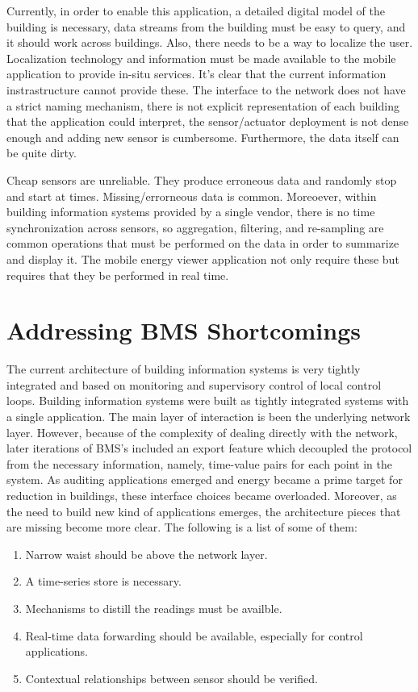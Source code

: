Currently, in order to enable this application, a detailed digital model of the building is necessary, data streams from the building must
be easy to query, and it should work across buildings.  Also, there needs to be a way to localize the user. 
Localization technology and information must be made available to the mobile application to provide in-situ services.
It's clear that the current information instrastructure cannot provide these.  The interface to the network does not have
a strict naming mechanism, there is not explicit representation of each building that the application could interpret, 
the sensor/actuator deployment is not dense enough and adding new sensor is cumbersome.  Furthermore, the data itself can be quite dirty.

Cheap sensors are unreliable.  They produce erroneous data and randomly stop and start at times.  Missing/errorneous data is common.
Moreoever, within building information systems provided by a single vendor, there is no time synchronization across sensors, so
aggregation, filtering, and re-sampling are common operations that must be performed on the data in order to summarize and display it.
The mobile energy viewer application not only require these but requires that they be performed in real time.


\section{Addressing BMS Shortcomings}
The current architecture of building information systems is very tightly integrated and based on monitoring and supervisory control
of local control loops.  Building information systems were built as tightly integrated systems with a single application.  The main
layer of interaction is been the underlying network layer.  However, because of the complexity of dealing directly with the network,
later iterations of BMS's included an export feature which decoupled the protocol from the necessary information, namely, time-value
pairs for each point in the system.  As auditing applications emerged and energy became a prime target for reduction in buildings, 
these interface choices became overloaded.  Moreover, as the need to build new kind of applications emerges, the architecture pieces
that are missing become more clear.  The following is a list of some of them:

\begin{enumerate}
\item Narrow waist should be above the network layer.
\item A time-series store is necessary.
\item Mechanisms to distill the readings must be availble.
\item Real-time data forwarding should be available, especially for control applications.
\item Contextual relationships between sensor should be verified.
\end{enumerate}

